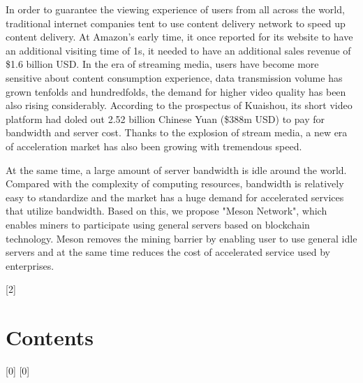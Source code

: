 \documentclass[12pt, a4paper, unicode]{report}
\begin{document}
    In order to guarantee the viewing experience of users from all across the world, traditional internet companies tent to use content delivery network to speed up content delivery. At Amazon's early time, it once reported for its website to have an additional visiting time of 1s, it needed to have an additional sales revenue of \$1.6 billion USD. In the era of streaming media, users have become more sensitive about content consumption experience, data transmission volume has grown tenfolds and hundredfolds, the demand for higher video quality has been also rising considerably. According to the prospectus of Kuaishou, its short video platform had doled out 2.52 billion Chinese Yuan (\$388m USD) to pay for bandwidth and server cost. Thanks to the explosion of stream media, a new era of acceleration market has also been growing with tremendous speed.

    At the same time, a large amount of server bandwidth is idle around the world. Compared with the complexity of computing resources, bandwidth is relatively easy to standardize and the market has a huge demand for accelerated services that utilize bandwidth. Based on this, we propose "Meson Network", which enables miners to participate using general servers based on blockchain technology. Meson removes the mining barrier by enabling user to use general idle servers and at the same time reduces the cost of accelerated service used by enterprises.



\clearpage





[2]{\chapter*{Contents}} 
[0]{}
[0]{}
\thispagestyle{empty}   %
\end{document}
